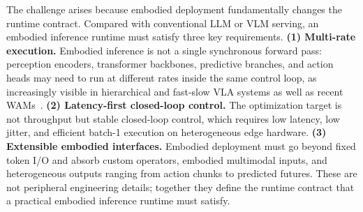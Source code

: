 \documentclass[11pt,letterpaper,logo]{seu-paisys}
\newcommand{\system}{\texttt{Embodied.cpp}\xspace}
\begin{document}

The challenge arises because embodied deployment fundamentally changes the runtime contract. Compared with conventional LLM or VLM serving, an embodied inference runtime must satisfy three key requirements. \textbf{(1) Multi-rate execution.} Embodied inference is not a single synchronous forward pass: perception encoders, transformer backbones, predictive branches, and action heads may need to run at different rates inside the same control loop, as increasingly visible in hierarchical and fast-slow VLA systems as well as recent WAMs~\cite{pi05,grootn1,lingbotva}. \textbf{(2) Latency-first closed-loop control.} The optimization target is not throughput but stable closed-loop control, which requires low latency, low jitter, and efficient batch-1 execution on heterogeneous edge hardware. \textbf{(3) Extensible embodied interfaces.} Embodied deployment must go beyond fixed token I/O and absorb custom operators, embodied multimodal inputs, and heterogeneous outputs ranging from action chunks to predicted futures. These are not peripheral engineering details; together they define the runtime contract that a practical embodied inference runtime must satisfy.

\end{document}
